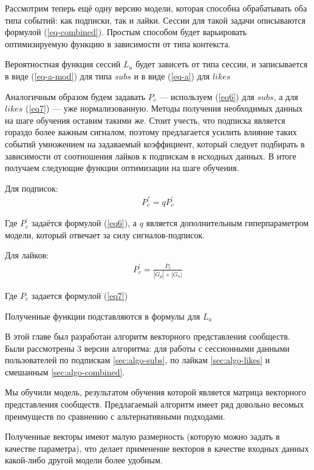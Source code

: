 \documentclass[times,specification,annotation]{itmo-student-thesis}
\begin{document}
Рассмотрим теперь ещё одну версию модели, которая способна обрабатывать оба типа событий: как подписки, так и лайки. Сессии для такой задачи описываются формулой (\ref{eq-combined}). Простым способом будет варьировать оптимизируемую функцию в зависимости от типа контекста. 

Вероятностная функция сессий $L_a$ будет зависеть от типа сессии, и записывается в виде (\ref{eq-a-mod}) для типа $subs$ и в виде (\ref{eq-a}) для $likes$

Аналогичным образом будем задавать $P_c$ --- используем (\ref{eq6}) для $subs$, а для $likes$ (\ref{eq7}) --- уже нормализованную. Методы получения необходимых данных на шаге обучения оставим такими же. Стоит учесть, что подписка является гораздо более важным сигналом, поэтому предлагается усилить влияние таких событий умножением на задаваемый коэффициент, который следует подбирать в зависимости от соотношения лайков к подпискам в исходных данных. В итоге получаем следующие функции оптимизации на шаге обучения.

Для подписок:
\begin{align*}
P^{''}_c = qP^{'}_c
\end{align*}

Где $P^{'}_c$ задаётся формулой  (\ref{eq6}), а $q$ является дополнительным гиперпараметром модели, который отвечает за силу сигналов-подписок. 

Для лайков:
\begin{align*}
P^{'}_c = \frac{P_c}{|G_p| +|G_n|} 
\end{align*}

Где $P_c$ задается формулой  (\ref{eq7})

Полученные функции подставляются в формулы для $L_a$

\chapterconclusion

В этой главе был разработан алгоритм векторного представления сообществ. Были рассмотрены 3 версии алгоритма: для работы с сессионными данными пользователей по подпискам \ref{sec:algo-subs}, по лайкам \ref{sec:algo-likes} и смешанным \ref{sec:algo-combined}.

Мы обучили модель, результатом обучения которой является матрица векторного
представления сообществ. Предлагаемый алгоритм имеет ряд довольно весомых
преимуществ по сравнению с альтернативными подходами. 

Полученные векторы
имеют малую размерность (которую можно задать в качестве параметра), что
делает применение векторов в качестве входных данных какой-либо другой
модели более удобным. 
\end{document}
